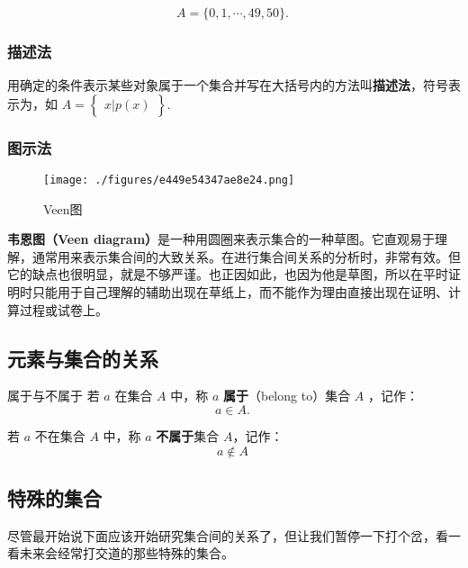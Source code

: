\begin{equation}
A=\{0,1, \cdots ,49,50\}.~
\end{equation}


\subsubsection{描述法}

用确定的条件表示某些对象属于一个集合并写在大括号内的方法叫\textbf{描述法}，符号表示为，如 $A=\begin{Bmatrix} x|p(x) \end{Bmatrix}$.

\subsubsection{图示法}

\begin{figure}[ht]
\centering
\texttt{[image: ./figures/e449e54347ae8e24.png]}
\caption{Veen图} \label{fig_SufCnd_1}
\end{figure}

\textbf{韦恩图（Veen diagram）}是一种用圆圈来表示集合的一种草图。它直观易于理解，通常用来表示集合间的大致关系。在进行集合间关系的分析时，非常有效。但它的缺点也很明显，就是不够严谨。也正因如此，也因为他是草图，所以在平时证明时只能用于自己理解的辅助出现在草纸上，而不能作为理由直接出现在证明、计算过程或试卷上。

\subsection{元素与集合的关系}

\begin{definition}{属于与不属于}
若 $a$ 在集合 $A$ 中，称 $a$ \textbf{属于}（belong to）集合 $A$ ，记作：
\begin{equation}
a \in A.~
\end{equation}

若 $a$ 不在集合 $A$ 中，称 $a$ \textbf{不属于}集合 $A$，记作：
\begin{equation}
a\notin A~
\end{equation}
\end{definition}

\subsection{特殊的集合}

尽管最开始说下面应该开始研究集合间的关系了，但让我们暂停一下打个岔，看一看未来会经常打交道的那些特殊的集合。
